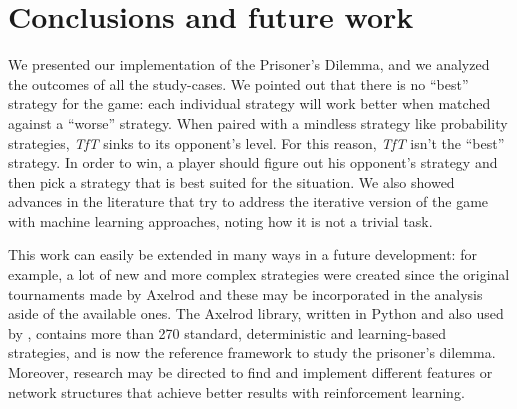 \documentclass[journal,10pt,twoside]{IEEEtran}
\begin{document}
\section{Conclusions and future work} \label{s:conc}
We presented our implementation of the Prisoner's Dilemma, and we analyzed the outcomes of all the study-cases.
We pointed out that there is no ``best'' strategy for the game: each individual strategy will work better when matched against a ``worse'' strategy. When paired with a mindless strategy like probability strategies, \textit{TfT} sinks to its opponent's level. For this reason, \textit{TfT} isn't the ``best'' strategy. In order to win, a player should figure out his opponent's strategy and then pick a strategy that is best suited for the situation.
We also showed advances in the literature that try to address the iterative version of the game with machine learning approaches, noting how it is not a trivial task. 

This work can easily be extended in many ways in a future development: for example, a lot of new and more complex strategies were created since the original tournaments made by Axelrod and these may be incorporated in the analysis aside of the available ones.
The Axelrod library, \cite{Knight2016Axel,axel-lib} written in Python and also used by \cite{plosRLdominant}, contains more than 270 standard, deterministic and learning-based strategies, and is now the reference framework to study the prisoner's dilemma.
Moreover, research may be directed to find and implement different features or network structures that achieve better results with reinforcement learning.

\balance



\onecolumn
{} \label{s:appendix}

\end{document}

